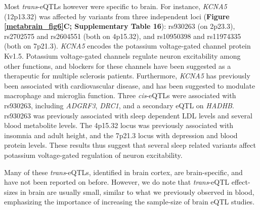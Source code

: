 Most \emph{trans}-eQTLs however were specific to brain. For instance, \emph{KCNA5} (12p13.32) was affected by variants from three independent loci (\textbf{Figure \ref{metabrain_fig6}C; Supplementary Table 16}): rs930263 (on 2p23.3), rs2702575 and rs2604551 (both on 4p15.32), and rs10950398 and rs11974335 (both on 7p21.3). \emph{KCNA5} encodes the potassium voltage-gated channel protein Kv1.5. Potassium voltage-gated channels regulate neuron excitability among other functions, and blockers for these channels have been suggested as a therapeutic for multiple sclerosis patients\cite{jDalfampridineBriefReview2011}. Furthermore, \emph{KCNA5} has previously been associated with cardiovascular disease\cite{al-owaisMultipleMechanismsMediating2017}, and has been suggested to modulate macrophage and microglia function\cite{rusVoltagegatedPotassiumChannel2005}. Three \emph{cis}-eQTLs were associated with rs930263, including \emph{ADGRF3}, \emph{DRC1}, and a secondary eQTL on \emph{HADHB}. rs930263 was previously associated with sleep dependent LDL levels\cite{noordamMultiancestrySleepbySNPInteraction2019} and several blood metabolite levels\cite{galloisComprehensiveStudyMetabolite2019,sunGenomicAtlasHuman2018,suhreConnectingGeneticRisk2017,tinTargetGenesVariants2019}. The 4p15.32 locus was previously associated with insomnia and adult height\cite{kichaevLeveragingPolygenicFunctional2019}, and the 7p21.3 locus with depression and blood protein levels. These results thus suggest that several sleep related variants affect potassium voltage-gated regulation of neuron excitability.  

Many of these \emph{trans}-eQTLs, identified in brain cortex, are brain-specific, and have not been reported on before. However, we do note that \emph{trans}-eQTL effect-sizes in brain are usually small, similar to what we previously observed in blood, emphasizing the importance of increasing the sample-size of brain eQTL studies. 

